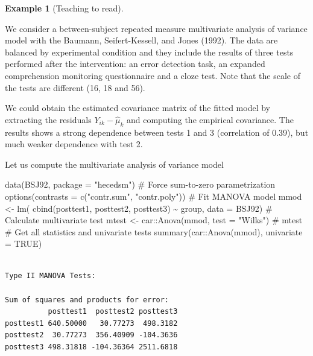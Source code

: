 \documentclass[
  11pt,
  letterpaper,
]{scrbook}
\newenvironment{Shaded}{\begin{snugshade}}{\end{snugshade}}
\newcommand{\AttributeTok}[1]{\textcolor[rgb]{0.40,0.45,0.13}{#1}}
\newcommand{\CommentTok}[1]{\textcolor[rgb]{0.37,0.37,0.37}{#1}}
\newcommand{\ConstantTok}[1]{\textcolor[rgb]{0.56,0.35,0.01}{#1}}
\newcommand{\FunctionTok}[1]{\textcolor[rgb]{0.28,0.35,0.67}{#1}}
\newcommand{\NormalTok}[1]{\textcolor[rgb]{0.00,0.23,0.31}{#1}}
\newcommand{\OtherTok}[1]{\textcolor[rgb]{0.00,0.23,0.31}{#1}}
\newcommand{\SpecialCharTok}[1]{\textcolor[rgb]{0.37,0.37,0.37}{#1}}
\newcommand{\StringTok}[1]{\textcolor[rgb]{0.13,0.47,0.30}{#1}}
\theoremstyle{definition}
\newtheorem{example}{Example}[chapter]
\theoremstyle{remark}
\begin{document}
\begin{example}[Teaching to
read]\protect\hypertarget{exm-baumann-multi}{}\label{exm-baumann-multi}

We consider a between-subject repeated measure multivariate analysis of
variance model with the Baumann, Seifert-Kessell, and Jones (1992). The
data are balanced by experimental condition and they include the results
of three tests performed after the intervention: an error detection
task, an expanded comprehension monitoring questionnaire and a cloze
test. Note that the scale of the tests are different (16, 18 and 56).

We could obtain the estimated covariance matrix of the fitted model by
extracting the residuals \(Y_{ik} - \widehat{\mu}_k\) and computing the
empirical covariance. The results shows a strong dependence between
tests 1 and 3 (correlation of 0.39), but much weaker dependence with
test 2.

Let us compute the multivariate analysis of variance model

\begin{Shaded}
\begin{Highlighting}[]
\FunctionTok{data}\NormalTok{(BSJ92, }\AttributeTok{package =} \StringTok{"hecedsm"}\NormalTok{)}
\CommentTok{\# Force sum{-}to{-}zero parametrization}
\FunctionTok{options}\NormalTok{(}\AttributeTok{contrasts =} \FunctionTok{c}\NormalTok{(}\StringTok{"contr.sum"}\NormalTok{, }\StringTok{"contr.poly"}\NormalTok{))}
\CommentTok{\# Fit MANOVA model}
\NormalTok{mmod }\OtherTok{\textless{}{-}} \FunctionTok{lm}\NormalTok{(}
  \FunctionTok{cbind}\NormalTok{(posttest1, posttest2, posttest3) }\SpecialCharTok{\textasciitilde{}}\NormalTok{ group,}
   \AttributeTok{data =}\NormalTok{ BSJ92)}
\CommentTok{\# Calculate multivariate test}
\NormalTok{mtest }\OtherTok{\textless{}{-}}\NormalTok{ car}\SpecialCharTok{::}\FunctionTok{Anova}\NormalTok{(mmod, }\AttributeTok{test =} \StringTok{"Wilks"}\NormalTok{)}
\CommentTok{\# mtest}
\CommentTok{\# Get all statistics and univariate tests}
\FunctionTok{summary}\NormalTok{(car}\SpecialCharTok{::}\FunctionTok{Anova}\NormalTok{(mmod), }\AttributeTok{univariate =} \ConstantTok{TRUE}\NormalTok{)}
\end{Highlighting}
\end{Shaded}

\begin{verbatim}

Type II MANOVA Tests:

Sum of squares and products for error:
          posttest1  posttest2 posttest3
posttest1 640.50000   30.77273  498.3182
posttest2  30.77273  356.40909 -104.3636
posttest3 498.31818 -104.36364 2511.6818


\end{verbatim}
\end{example}
\end{document}
